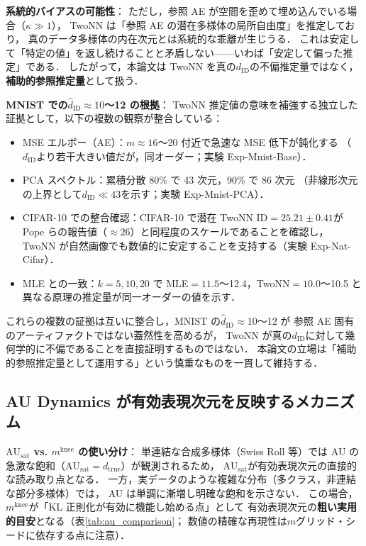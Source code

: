 \documentclass[11pt,a4paper]{jsarticle}
\newcommand{\dtrue}{d_{\mathrm{true}}}
\newcommand{\AUsat}{\mathrm{AU}_{\mathrm{sat}}}
\newcommand{\mknee}{m^{\mathrm{knee}}}
\begin{document}
\textbf{系統的バイアスの可能性}：
ただし，参照 AE が空間を歪めて埋め込んでいる場合（$\kappa \gg 1$），
TwoNN は「参照 AE の潜在多様体の局所自由度」を推定しており，
真のデータ多様体の内在次元とは系統的な乖離が生じうる．
これは安定して「特定の値」を返し続けることと矛盾しない——いわば「安定して偏った推定」である．
したがって，本論文は TwoNN を真の$d_\mathrm{ID}$の不偏推定量ではなく，
\textbf{補助的参照推定量}として扱う．

\textbf{MNIST での$\hat{d}_\mathrm{ID} \approx 10$〜12 の根拠}：
TwoNN 推定値の意味を補強する独立した証拠として，以下の複数の観察が整合している：
\begin{itemize}
  \item MSE エルボー（AE）：$m \approx 16$〜20 付近で急速な MSE 低下が鈍化する
        （$d_\mathrm{ID}$より若干大きい値だが，同オーダー；実験 Exp-Mnist-Base）．
  \item PCA スペクトル：累積分散 80\% で 43 次元，90\% で 86 次元
        （非線形次元の上界として$d_\mathrm{ID} \ll 43$を示す；実験 Exp-Mnist-PCA）．
  \item CIFAR-10 での整合確認：CIFAR-10 で潜在 TwoNN ID$=25.21\pm0.41$が
        Pope ら\cite{pope2021intrinsic}の報告値（$\approx26$）と同程度のスケールであることを確認し，
        TwoNN が自然画像でも数値的に安定することを支持する（実験 Exp-Nat-Cifar）．
  \item MLE との一致：$k=5,10,20$ で MLE$=11.5$〜12.4，TwoNN$=10.0$〜10.5 と
        異なる原理の推定量が同一オーダーの値を示す．
\end{itemize}
これらの複数の証拠は互いに整合し，MNIST の$\hat{d}_\mathrm{ID} \approx 10$〜12 が
参照 AE 固有のアーティファクトではない蓋然性を高めるが，
TwoNN が真の$d_\mathrm{ID}$に対して幾何学的に不偏であることを直接証明するものではない．
本論文の立場は「補助的参照推定量として運用する」という慎重なものを一貫して維持する．

\subsection{AU Dynamics が有効表現次元を反映するメカニズム}\label{sec:disc_au_dynamics}

\textbf{$\AUsat$ vs. $\mknee$ の使い分け}：
単連結な合成多様体（Swiss Roll 等）では AU の急激な飽和（$\AUsat = \dtrue$）が観測されるため，
$\AUsat$が有効表現次元の直接的な読み取り点となる．
一方，実データのような複雑な分布（多クラス，非連結な部分多様体）では，
AU は単調に漸増し明確な飽和を示さない．
この場合，$\mknee$が「KL 正則化が有効に機能し始める点」として
有効表現次元の\textbf{粗い実用的目安}となる（表\ref{tab:au_comparison}；
数値の精確な再現性は$m$グリッド・シードに依存する点に注意）．
\end{document}
